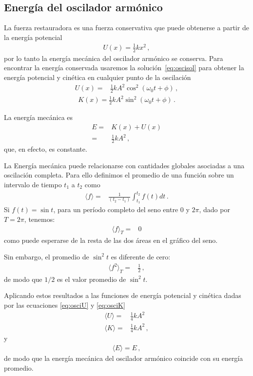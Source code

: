 \subsection{Energía del oscilador armónico}

La fuerza restauradora es una fuerza conservativa que puede obtenerse a partir de la energía potencial
\begin{align*}
  U(x)=\tfrac{1}{2}k x^2\,,
\end{align*}
por lo tanto la energía mecánica del oscilador armónico se conserva. Para encontrar la energía conservada usaremos la solución~\eqref{eq:oscisol} para obtener la energía potencial y cinética en cualquier punto de la oscilación
\begin{align}
\label{eq:osciU}
U(x)=&\tfrac{1}{2}k A^2\cos^2(\omega_0 t+\phi)\,,
\end{align}
\begin{align}
  \label{eq:osciK}
  K(x)=\tfrac{1}{2}k A^2\sin^2(\omega_0 t+\phi)\,.
\end{align}

La energía mecánica es
\begin{align}
  \label{eq:osciE}
  E=&K(x)+U(x)\nonumber\\
  =&\tfrac{1}{2}k A^2\,,
\end{align}
que, en efecto, es constante. 

La Energía mecánica puede relacionarse con cantidades globales asociadas a una oscilación completa. Para ello definimos el promedio de una función sobre un intervalo de tiempo $t_1$ a $t_2$ como
\begin{align*}
  \langle f\rangle=&\frac{1}{(t_2-t_1)}\int_{t_1}^{t_2} f(t) dt\,.
\end{align*}
Si $f(t)=\sin t$, para un período completo del seno entre $0$ y $2\pi$, dado por $T=2\pi$, tenemos:
\begin{align*}
  \langle f\rangle_T=&0
\end{align*}
como puede esperarse de la resta de las dos áreas en el gráfico del seno. %

Sin embargo, el promedio de $\sin^2t$ es diferente de cero: %
\begin{align*}
  \langle f^2\rangle_T=&\frac{1}{2}\,,
\end{align*}
de modo que $1/2$ es el valor promedio de $\sin^2 t$. 

Aplicando estos resultados a las funciones de energía potencial y cinética dadas por las ecuaciones \eqref{eq:osciU} y \eqref{eq:osciK}
\begin{align*}
  \langle U\rangle=&\tfrac{1}{4}k A^2\nonumber\\
  \langle K\rangle=&\tfrac{1}{4}k A^2\,,
\end{align*}
y
\begin{align*}
  \langle E\rangle=E\,,
\end{align*}
de modo que la energía mecánica del oscilador armónico coincide con su energía promedio.

